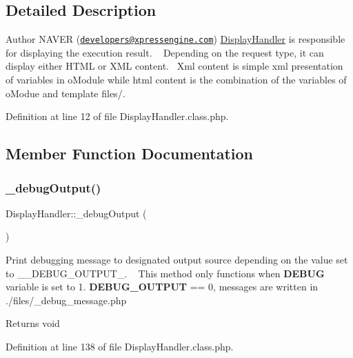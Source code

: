 \subsection{Detailed Description}
\begin{DoxyAuthor}{Author}
N\+A\+V\+ER (\href{mailto:developers@xpressengine.com}{\tt developers@xpressengine.\+com}) \hyperlink{classDisplayHandler}{Display\+Handler} is responsible for displaying the execution result. ~\newline
 Depending on the request type, it can display either H\+T\+ML or X\+ML content.~\newline
 Xml content is simple xml presentation of variables in o\+Module while html content is the combination of the variables of o\+Modue and template files/. 
\end{DoxyAuthor}


Definition at line 12 of file Display\+Handler.\+class.\+php.



\subsection{Member Function Documentation}
\hypertarget{classDisplayHandler_ade82618e903db5607dbc311f87f997f7}{}\label{classDisplayHandler_ade82618e903db5607dbc311f87f997f7} 
\subsubsection{\texorpdfstring{\+\_\+debug\+Output()}{\_debugOutput()}}
{\footnotesize\ttfamily Display\+Handler\+::\+\_\+debug\+Output (\begin{DoxyParamCaption}{ }\end{DoxyParamCaption})}

Print debugging message to designated output source depending on the value set to \+\_\+\+\_\+\+D\+E\+B\+U\+G\+\_\+\+O\+U\+T\+P\+U\+T\+\_\+. ~\newline
This method only functions when {\bfseries D\+E\+B\+UG} variable is set to 1. {\bfseries D\+E\+B\+U\+G\+\_\+\+O\+U\+T\+P\+UT} == 0, messages are written in ./files/\+\_\+debug\+\_\+message.php \begin{DoxyReturn}{Returns}
void 
\end{DoxyReturn}


Definition at line 138 of file Display\+Handler.\+class.\+php.

